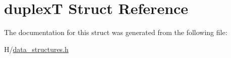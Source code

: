 \hypertarget{structduplexT}{
\section{duplexT Struct Reference}
\label{structduplexT}
}


The documentation for this struct was generated from the following file:\begin{DoxyCompactItemize}
\item 
H/\hyperlink{data__structures_8h}{data\_\-structures.h}\end{DoxyCompactItemize}
